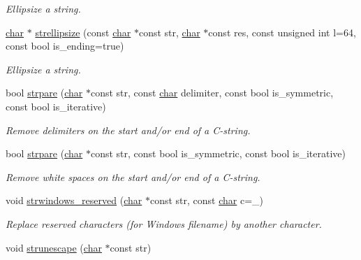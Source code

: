 \begin{DoxyCompactItemize}
\begin{DoxyCompactList}\small\item\em Ellipsize a string. \end{DoxyCompactList}\item 
\hyperlink{classchar}{char} $\ast$ \hyperlink{namespacecimg__library__suffixed_1_1cimg_a79b0ac227dd09ae4cdb84658d2fd919b}{strellipsize} (const \hyperlink{classchar}{char} $\ast$const str, \hyperlink{classchar}{char} $\ast$const res, const unsigned int l=64, const bool is\+\_\+ending=true)
\begin{DoxyCompactList}\small\item\em Ellipsize a string. \end{DoxyCompactList}\item 
bool \hyperlink{namespacecimg__library__suffixed_1_1cimg_a85cb703b948df7a021fd41ca3bad6696}{strpare} (\hyperlink{classchar}{char} $\ast$const str, const \hyperlink{classchar}{char} delimiter, const bool is\+\_\+symmetric, const bool is\+\_\+iterative)
\begin{DoxyCompactList}\small\item\em Remove delimiters on the start and/or end of a C-\/string. \end{DoxyCompactList}\item 
\mbox{\label{namespacecimg__library__suffixed_1_1cimg_ac9e23320a870b0ebce24c7a6059c7467}} 
bool \hyperlink{namespacecimg__library__suffixed_1_1cimg_ac9e23320a870b0ebce24c7a6059c7467}{strpare} (\hyperlink{classchar}{char} $\ast$const str, const bool is\+\_\+symmetric, const bool is\+\_\+iterative)
\begin{DoxyCompactList}\small\item\em Remove white spaces on the start and/or end of a C-\/string. \end{DoxyCompactList}\item 
void \hyperlink{namespacecimg__library__suffixed_1_1cimg_a3dff5896c142fb4f9dbd2d49facd33c0}{strwindows\+\_\+reserved} (\hyperlink{classchar}{char} $\ast$const str, const \hyperlink{classchar}{char} c=\textquotesingle{}\+\_\+\textquotesingle{})
\begin{DoxyCompactList}\small\item\em Replace reserved characters (for Windows filename) by another character. \end{DoxyCompactList}\item 
void \hyperlink{namespacecimg__library__suffixed_1_1cimg_a1ffad008d2b45ffa0ff4d0f32b6c98ec}{strunescape} (\hyperlink{classchar}{char} $\ast$const str)

\end{DoxyCompactItemize}
